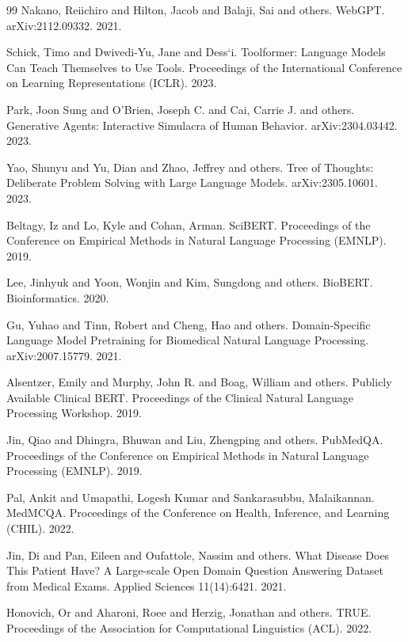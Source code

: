 \begin{thebibliography}{99}
Nakano, Reiichiro and Hilton, Jacob and Balaji, Sai and others. WebGPT. arXiv:2112.09332. 2021.

Schick, Timo and Dwivedi-Yu, Jane and Dess`i. Toolformer: Language Models Can Teach Themselves to Use Tools. Proceedings of the International Conference on Learning Representations (ICLR). 2023.

Park, Joon Sung and O'Brien, Joseph C. and Cai, Carrie J. and others. Generative Agents: Interactive Simulacra of Human Behavior. arXiv:2304.03442. 2023.

Yao, Shunyu and Yu, Dian and Zhao, Jeffrey and others. Tree of Thoughts: Deliberate Problem Solving with Large Language Models. arXiv:2305.10601. 2023.

Beltagy, Iz and Lo, Kyle and Cohan, Arman. SciBERT. Proceedings of the Conference on Empirical Methods in Natural Language Processing (EMNLP). 2019.

Lee, Jinhyuk and Yoon, Wonjin and Kim, Sungdong and others. BioBERT. Bioinformatics. 2020.

Gu, Yuhao and Tinn, Robert and Cheng, Hao and others. Domain-Specific Language Model Pretraining for Biomedical Natural Language Processing. arXiv:2007.15779. 2021.

Alsentzer, Emily and Murphy, John R. and Boag, William and others. Publicly Available Clinical BERT. Proceedings of the Clinical Natural Language Processing Workshop. 2019.

Jin, Qiao and Dhingra, Bhuwan and Liu, Zhengping and others. PubMedQA. Proceedings of the Conference on Empirical Methods in Natural Language Processing (EMNLP). 2019.

Pal, Ankit and Umapathi, Logesh Kumar and Sankarasubbu, Malaikannan. MedMCQA. Proceedings of the Conference on Health, Inference, and Learning (CHIL). 2022.

Jin, Di and Pan, Eileen and Oufattole, Nassim and others. What Disease Does This Patient Have? A Large-scale Open Domain Question Answering Dataset from Medical Exams. Applied Sciences 11(14):6421. 2021.

Honovich, Or and Aharoni, Roee and Herzig, Jonathan and others. TRUE. Proceedings of the Association for Computational Linguistics (ACL). 2022.


\end{thebibliography}
